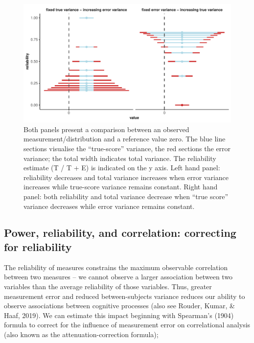 \documentclass[english,,man,floatsintext]{apa6}
\begin{document}
\begin{figure}
\centering
\includegraphics{Parsons_Kruijt_Fox_-_reporting_reliability_files/figure-latex/figureone-1.pdf}
\caption{\label{fig:figureone}Both panels present a comparison between an observed measurement/distribution and a reference value zero. The blue line sections visualise the \enquote{true-score} variance, the red sections the error variance; the total width indicates total variance. The reliability estimate (T / T + E) is indicated on the y axis. Left hand panel: reliability decreases and total variance increases when error variance increases while true-score variance remains constant. Right hand panel: both reliability and total variance decrease when \enquote{true score} variance decreases while error variance remains constant.}
\end{figure}

\hypertarget{power-reliability-and-correlation-correcting-for-reliability}{%
\subsection{Power, reliability, and correlation: correcting for reliability}\label{power-reliability-and-correlation-correcting-for-reliability}}

The reliability of measures constrains the maximum observable correlation between two measures -- we cannot observe a larger association between two variables than the average reliability of those variables. Thus, greater measurement error and reduced between-subjects variance reduces our ability to observe associations between cognitive processes (also see Rouder, Kumar, \& Haaf, 2019). We can estimate this impact beginning with Spearman's (1904) formula to correct for the influence of measurement error on correlational analysis (also known as the attenuation-correction formula);
\end{document}
